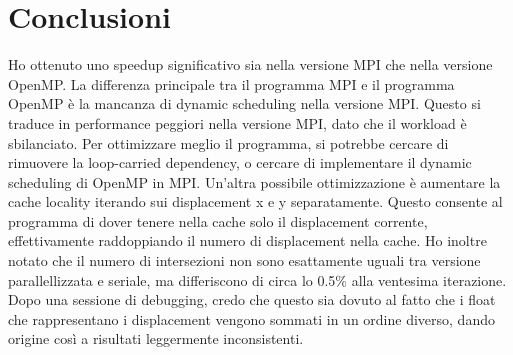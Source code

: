 \documentclass[a4paper,11pt, twoside]{report}
\begin{document}
\section*{Conclusioni}
Ho ottenuto uno speedup significativo sia nella versione MPI che nella versione OpenMP.
La differenza principale tra il programma MPI e il programma OpenMP è la mancanza di dynamic scheduling nella versione MPI.
Questo si traduce in performance peggiori nella versione MPI, dato che il workload è sbilanciato.
Per ottimizzare meglio il programma, si potrebbe cercare di rimuovere la loop-carried dependency, o cercare di implementare il dynamic scheduling di OpenMP in MPI.
Un'altra possibile ottimizzazione è aumentare la cache locality iterando sui displacement x e y separatamente.
Questo consente al programma di dover tenere nella cache solo il displacement corrente, effettivamente raddoppiando il numero di displacement nella cache.
Ho inoltre notato che il numero di intersezioni non sono esattamente uguali tra versione parallellizzata e seriale, ma differiscono di circa lo 0.5\% alla ventesima iterazione.
Dopo una sessione di debugging, credo che questo sia dovuto al fatto che i float che rappresentano i displacement vengono sommati in un ordine diverso, dando origine così a risultati leggermente inconsistenti.
\printbibliography
\appendix
\end{document}
